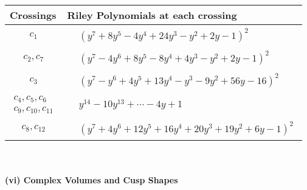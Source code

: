 \documentclass[1p]{elsarticle_modified}
\theoremstyle{definition}
\begin{document}
\begin{tabular}{m{50pt}|m{274pt}}
Crossings & \hspace{64pt}Riley Polynomials at each crossing \\
\hline $$\begin{aligned}c_{1}\end{aligned}$$&$\begin{aligned}
&(y^7+8 y^5-4 y^4+24 y^3- y^2+2 y-1)^2
\end{aligned}$\\
\hline $$\begin{aligned}c_{2},c_{7}\end{aligned}$$&$\begin{aligned}
&(y^7-4 y^6+8 y^5-8 y^4+4 y^3- y^2+2 y-1)^2
\end{aligned}$\\
\hline $$\begin{aligned}c_{3}\end{aligned}$$&$\begin{aligned}
&(y^7- y^6+4 y^5+13 y^4- y^3-9 y^2+56 y-16)^2
\end{aligned}$\\
\hline $$\begin{aligned}c_{4},c_{5},c_{6}\\c_{9},c_{10},c_{11}\end{aligned}$$&$\begin{aligned}
&y^{14}-10 y^{13}+\cdots-4 y+1
\end{aligned}$\\
\hline $$\begin{aligned}c_{8},c_{12}\end{aligned}$$&$\begin{aligned}
&(y^7+4 y^6+12 y^5+16 y^4+20 y^3+19 y^2+6 y-1)^2
\end{aligned}$\\
\hline
\end{tabular}\\~\\
\newpage\flushleft \textbf{(vi) Complex Volumes and Cusp Shapes}
\end{document}
